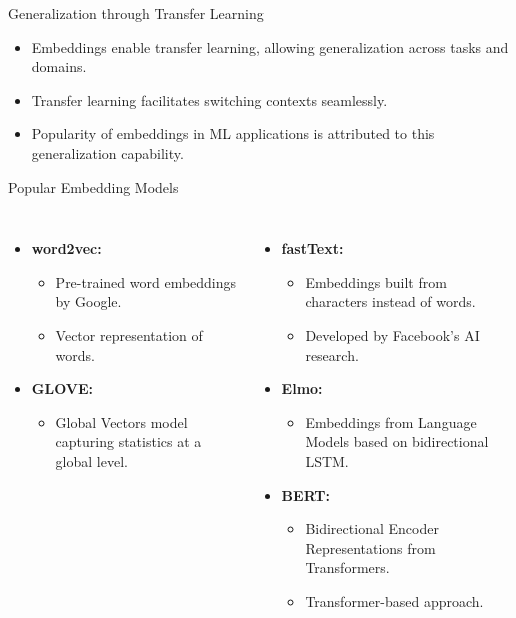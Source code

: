 \begin{frame}[fragile]{Generalization through Transfer Learning}
  \begin{itemize}
    \item Embeddings enable transfer learning, allowing generalization across tasks and domains.
    \item Transfer learning facilitates switching contexts seamlessly.
    \item Popularity of embeddings in ML applications is attributed to this generalization capability.
  \end{itemize}
\end{frame}

\begin{frame}[fragile]{Popular Embedding Models}
  \begin{columns}
      \begin{itemize}
        \item \textbf{word2vec:}
          \begin{itemize}
            \item Pre-trained word embeddings by Google.
            \item Vector representation of words.
          \end{itemize}
        \item \textbf{GLOVE:}
          \begin{itemize}
            \item Global Vectors model capturing statistics at a global level.
          \end{itemize}
      \end{itemize}
      \begin{itemize}
        \item \textbf{fastText:}
          \begin{itemize}
            \item Embeddings built from characters instead of words.
            \item Developed by Facebook's AI research.
          \end{itemize}
        \item \textbf{Elmo:}
          \begin{itemize}
            \item Embeddings from Language Models based on bidirectional LSTM.
          \end{itemize}
        \item \textbf{BERT:}
          \begin{itemize}
            \item Bidirectional Encoder Representations from Transformers.
            \item Transformer-based approach.
          \end{itemize}
      \end{itemize}
  \end{columns}
\end{frame}

